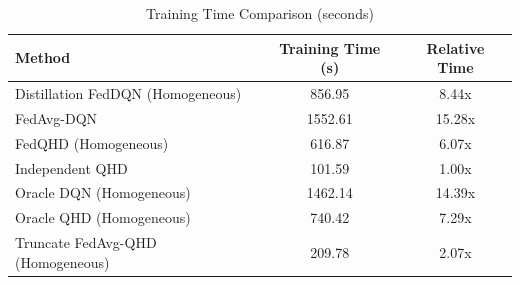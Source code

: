 \begin{table}[t]
\centering
\caption{Training Time Comparison (seconds)}
\label{tab:computation_cost}
\begin{tabular}{lcc}
\toprule
Method & Training Time (s) & Relative Time \\
\midrule
Distillation FedDQN (Homogeneous) & 856.95 & 8.44x \\
FedAvg-DQN & 1552.61 & 15.28x \\
FedQHD (Homogeneous) & 616.87 & 6.07x \\
Independent QHD & 101.59 & 1.00x \\
Oracle DQN (Homogeneous) & 1462.14 & 14.39x \\
Oracle QHD (Homogeneous) & 740.42 & 7.29x \\
Truncate FedAvg-QHD (Homogeneous) & 209.78 & 2.07x \\
\bottomrule
\end{tabular}
\end{table}